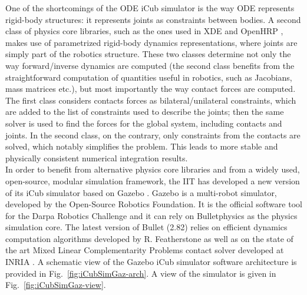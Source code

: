 \documentclass[12pt,a4paper,twoside]{article}
\begin{document}
One of the shortcomings of the ODE iCub simulator is the way ODE represents rigid-body structures: it represents joints as constraints between bodies. A second class of physics core libraries, such as the ones used in XDE \cite{XDE} and OpenHRP \cite{OPENHRP}, makes use of parametrized rigid-body dynamics representations, where joints are simply part of the robotics structure. These two classes determine not only the way forward/inverse dynamics are computed (the second class benefits from the straightforward computation of quantities useful in robotics, such as Jacobians, mass matrices etc.), but most importantly the way contact forces are computed. The first class considers contacts forces as bilateral/unilateral constraints, which are added to the list of constraints used to describe the joints; then the same solver is used to find the forces for the global system, including contacts and joints. In the second class, on the contrary, only constraints from the contacts are solved, which notably simplifies the problem. This leads to more stable and physically consistent numerical integration results.\\

In order to benefit from alternative physics core libraries and from a widely used, open-source, modular simulation framework, the IIT has developed a new version of its iCub simulator based on Gazebo  \cite{Gazebo}. Gazebo is a multi-robot simulator, developed by the Open-Source Robotics Foundation. It is the official software tool for the Darpa Robotics Challenge and it can rely on Bulletphysics \cite{Bullet} as the physics simulation core. The latest version of Bullet (2.82) relies on efficient dynamics computation algorithms developed by R. Featherstone \cite{Featherstone2007} as well as on the state of the art Mixed Linear Complementarity Problems contact solver developed at INRIA \cite{Siconos}.  A schematic view of the Gazebo iCub simulator software architecture is provided in Fig.~\ref{fig:iCubSimGaz-arch}. A view of the simulator is given in Fig.~\ref{fig:iCubSimGaz-view}.
\end{document}
